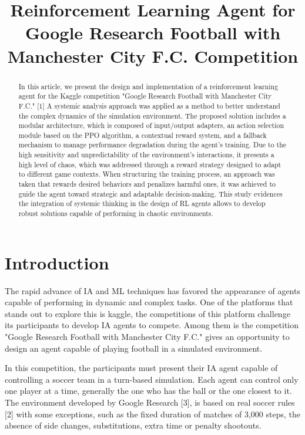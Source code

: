 \documentclass[conference]{IEEEtran}
\title{Reinforcement Learning Agent for Google Research Football with Manchester City F.C. Competition}
\author{
    \IEEEauthorblockN{J. D. Escallón Guzmán\IEEEauthorrefmark{1},
                      J. D. Lozano Luna\IEEEauthorrefmark{1},
                      J. E. Muñoz Gómez\IEEEauthorrefmark{1}}
    \IEEEauthorblockA{\IEEEauthorrefmark{1}Department of Computer Engineering\\
    Universidad Distrital Francisco José de Caldas\\
    Emails: \{jdescallong, judlozanol, jemunozg\}@udistrital.edu.co}
}
\date{}
\begin{document}
\maketitle

\begin{abstract}
In this article, we present the design and implementation of a reinforcement learning agent for the Kaggle competition "Google Research Football with Manchester City F.C." [1] A systemic analysis approach was applied as a method to better understand the complex dynamics of the simulation environment. The proposed solution includes a modular architecture, which is composed of input/output adapters, an action selection module based on the PPO algorithm, a contextual reward system, and a fallback mechanism to manage performance degradation during the agent’s training. Due to the high sensitivity and unpredictability of the environment’s interactions, it presents a high level of chaos, which was addressed through a reward strategy designed to adapt to different game contexts. When structuring the training process, an approach was taken that rewards desired behaviors and penalizes harmful ones, it was achieved to guide the agent toward strategic and adaptable decision-making. This study evidences the integration of systemic thinking in the design of RL agents allows to develop robust solutions capable of performing in chaotic environments.
\end{abstract}

\section{Introduction}
The rapid advance of IA and ML techniques has favored the appearance of agents capable of performing in dynamic and complex tasks. One of the platforms that stands out to explore this is kaggle, the competitions of this platform challenge its participants to develop IA agents to compete. Among them is the competition "Google Research Football with Manchester City F.C." gives an opportunity to design an agent capable of playing football in a simulated environment.

In this competition, the participants must present their IA agent capable of controlling a soccer team in a turn-based simulation. Each agent can control only one player at a time, generally the one who has the ball or the one closest to it. The environment developed by Google Research [3], is based on real soccer rules [2] with some exceptions, such as the fixed duration of matches of 3,000 steps, the absence of side changes, substitutions, extra time or penalty shootouts.
\end{document}
